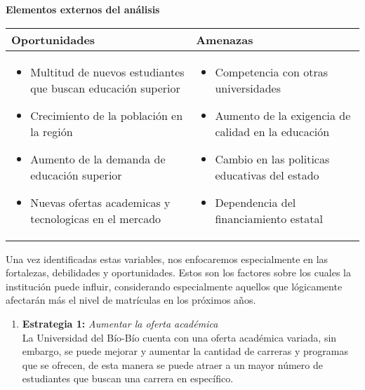 \documentclass{templateNote}
\begin{document}
\begin{enumerate}
\begin{center}
        \vspace{0.5cm} 

        \textbf{Elementos externos del análisis} 

        \vspace{0.5cm} 
        \begin{tabularx}{\textwidth}{|X|X|}
            \hline
            \textbf{Oportunidades} & \textbf{Amenazas} \\
            \hline
            \begin{itemize}[leftmargin=*]
                \item Multitud de nuevos estudiantes que buscan educación superior
                \item Crecimiento de la población en la región
                \item Aumento de la demanda de educación superior
                \item Nuevas ofertas academicas y tecnologicas en el mercado
            \end{itemize} 
            & 
            \begin{itemize}
                \item Competencia con otras universidades
                \item Aumento de la exigencia de calidad en la educación
                \item Cambio en las politicas educativas del estado
                \item Dependencia del financiamiento estatal
            \end{itemize}
            \\
            \hline
        \end{tabularx}
    \end{center}
    \newpage
    Una vez identificadas estas variables, nos enfocaremos especialmente en las fortalezas, debilidades y oportunidades. Estos son los factores sobre los cuales la institución puede influir, considerando especialmente aquellos que lógicamente afectarán más el nivel de matrículas en los próximos años.
    \begin{enumerate}
        \item \textbf{Estrategia 1:} \textit{Aumentar la oferta académica} \\
        \noindent La Universidad del Bío-Bío cuenta con una oferta académica variada, sin embargo, se puede mejorar y aumentar la cantidad de carreras y programas que se ofrecen, de esta manera se puede atraer a un mayor número de estudiantes que buscan una carrera en específico.\\

\end{enumerate}
\end{enumerate}
\end{document}

